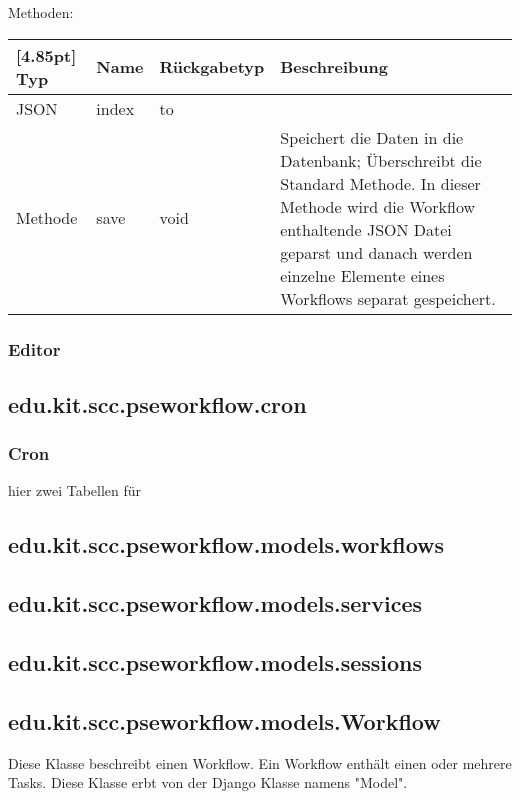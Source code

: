     
         Methoden:
        \begin{center}
        	\setlength\tabcolsep{5pt}
        	\renewcommand{\arraystretch}{1.5}
        	
        	\begin{tabularx}{\textwidth}{|l|l|l|X|}
        		\hline
        		\rowcolor[gray]{0.75}[4.85pt]
        		Typ & Name & Rückgabetyp & Beschreibung \\ \hline 
        		JSON & index & to  \\ \hline
        		Methode & save & void & Speichert die Daten in die Datenbank; Überschreibt die Standard Methode. In dieser Methode wird die Workflow enthaltende JSON Datei geparst und danach werden einzelne Elemente eines Workflows separat gespeichert. \\ 
        		\hline
        	\end{tabularx}
        \end{center}

		\subsubsection{Editor}

    \subsection{edu.kit.scc.pseworkflow.cron}

		\subsubsection{Cron}
		
		hier zwei Tabellen für 


    \subsection{edu.kit.scc.pseworkflow.models.workflows}

    \subsection{edu.kit.scc.pseworkflow.models.services}

    \subsection{edu.kit.scc.pseworkflow.models.sessions}

        \subsection{edu.kit.scc.pseworkflow.models.Workflow}
	        Diese Klasse beschreibt einen Workflow. Ein Workflow enthält einen oder mehrere Tasks. \newline
	        Diese Klasse erbt von der Django Klasse namens "Model".
                    
